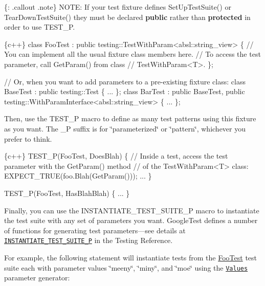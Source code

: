 \{\+: .callout .note\} N\+O\+TE\+: If your test fixture defines {\ttfamily Set\+Up\+Test\+Suite()} or {\ttfamily Tear\+Down\+Test\+Suite()} they must be declared {\bfseries public} rather than {\bfseries protected} in order to use {\ttfamily T\+E\+S\+T\+\_\+P}.


\begin{DoxyCode}
\{c++\}
class FooTest :
    public testing::TestWithParam<absl::string\_view> \{
  // You can implement all the usual fixture class members here.
  // To access the test parameter, call GetParam() from class
  // TestWithParam<T>.
\};

// Or, when you want to add parameters to a pre-existing fixture class:
class BaseTest : public testing::Test \{
  ...
\};
class BarTest : public BaseTest,
                public testing::WithParamInterface<absl::string\_view> \{
  ...
\};
\end{DoxyCode}


Then, use the {\ttfamily T\+E\+S\+T\+\_\+P} macro to define as many test patterns using this fixture as you want. The {\ttfamily \+\_\+P} suffix is for \char`\"{}parameterized\char`\"{} or \char`\"{}pattern\char`\"{}, whichever you prefer to think.


\begin{DoxyCode}
\{c++\}
TEST\_P(FooTest, DoesBlah) \{
  // Inside a test, access the test parameter with the GetParam() method
  // of the TestWithParam<T> class:
  EXPECT\_TRUE(foo.Blah(GetParam()));
  ...
\}

TEST\_P(FooTest, HasBlahBlah) \{
  ...
\}
\end{DoxyCode}


Finally, you can use the {\ttfamily I\+N\+S\+T\+A\+N\+T\+I\+A\+T\+E\+\_\+\+T\+E\+S\+T\+\_\+\+S\+U\+I\+T\+E\+\_\+P} macro to instantiate the test suite with any set of parameters you want. Google\+Test defines a number of functions for generating test parameters—see details at \href{reference/testing.md#INSTANTIATE_TEST_SUITE_P}{\tt {\ttfamily I\+N\+S\+T\+A\+N\+T\+I\+A\+T\+E\+\_\+\+T\+E\+S\+T\+\_\+\+S\+U\+I\+T\+E\+\_\+P}} in the Testing Reference.

For example, the following statement will instantiate tests from the {\ttfamily \mbox{\hyperlink{classFooTest}{Foo\+Test}}} test suite each with parameter values {\ttfamily \char`\"{}meeny\char`\"{}}, {\ttfamily \char`\"{}miny\char`\"{}}, and {\ttfamily \char`\"{}moe\char`\"{}} using the \href{reference/testing.md#param-generators}{\tt {\ttfamily Values}} parameter generator\+:



